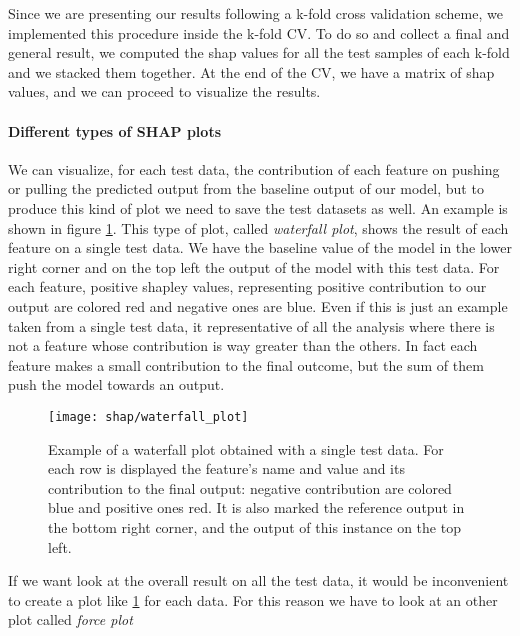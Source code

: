 \documentclass[11pt]{report}
\begin{document}
Since we are presenting our results following a k-fold cross validation scheme, we implemented this procedure inside the k-fold CV.
To do so and collect a final and general result, we computed the shap values for all the test samples of each k-fold and we stacked them together.
At the end of the CV, we have a matrix of shap values, and we can proceed to visualize the results.

\paragraph{Different types of SHAP plots} \hfill

We can visualize, for each test data, the contribution of each feature on pushing or pulling the predicted output from the baseline output of our model, but to produce this kind of plot we need to save the test datasets as well.
An example is shown in figure \ref{fig:shap_waterfall}.
This type of plot, called \emph{waterfall plot}, shows the result of each feature on a single test data.
We have the baseline value of the model in the lower right corner and on the top left the output of the model with this test data.
For each feature, positive shapley values, representing positive contribution to our output are colored red and negative ones are blue.
Even if this is just an example taken from a single test data, it representative of all the analysis where there is not a feature whose contribution is way greater than the others.
In fact each feature makes a small contribution to the final outcome, but the sum of them push the model towards an output.


\begin{figure}[h]
\centering
\texttt{[image: shap/waterfall\_plot]}
\caption{Example of a waterfall plot obtained with a single test data. For each row is displayed the feature's name and value and its contribution to the final output: negative contribution are colored blue and positive ones red. It is also marked the reference output in the bottom right corner, and the output of this instance on the top left.
}\label{fig:shap_waterfall}
\end{figure}


If we want look at the overall result on all the test data, it would be inconvenient to create a plot like \ref{fig:shap_waterfall} for each data. For this reason we have to look at an other plot called \emph{force plot}
\end{document}
